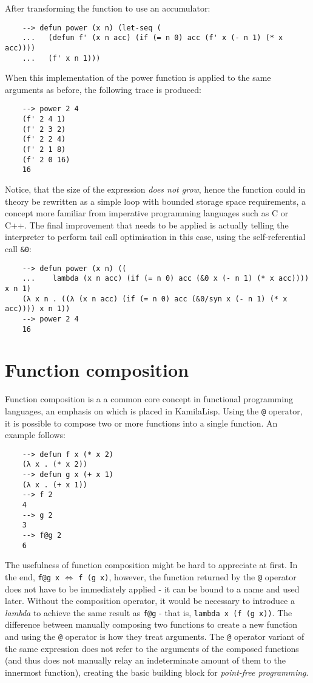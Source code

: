After transforming the function to use an accumulator:

\begin{Verbatim}
    --> defun power (x n) (let-seq (
    ...   (defun f' (x n acc) (if (= n 0) acc (f' x (- n 1) (* x acc))))
    ...   (f' x n 1)))
\end{Verbatim}

When this implementation of the power function is applied to the same arguments as before, the following trace is produced:

\begin{Verbatim}
    --> power 2 4
    (f' 2 4 1)
    (f' 2 3 2)
    (f' 2 2 4)
    (f' 2 1 8)
    (f' 2 0 16)
    16
\end{Verbatim}

Notice, that the size of the expression \textit{does not grow}, hence the function could in theory be rewritten as a simple loop with bounded storage space requirements, a concept more familiar from imperative programming languages such as C or C++. The final improvement that needs to be applied is actually telling the interpreter to perform tail call optimisation in this case, using the self-referential call \verb|&0|:

\begin{Verbatim}
    --> defun power (x n) ((
    ...    lambda (x n acc) (if (= n 0) acc (&0 x (- n 1) (* x acc)))) x n 1)
    (λ x n . ((λ (x n acc) (if (= n 0) acc (&0/syn x (- n 1) (* x acc)))) x n 1))
    --> power 2 4
    16
\end{Verbatim}

\section{Function composition}

Function composition is a a common core concept in functional programming languages, an emphasis on which is placed in KamilaLisp. Using the \verb|@| operator, it is possible to compose two or more functions into a single function. An example follows:

\begin{Verbatim}
    --> defun f x (* x 2)
    (λ x . (* x 2))
    --> defun g x (+ x 1)
    (λ x . (+ x 1))
    --> f 2
    4
    --> g 2
    3
    --> f@g 2
    6
\end{Verbatim}

The usefulness of function composition might be hard to appreciate at first. In the end, \verb|f@g x| $\Leftrightarrow$ \verb|f (g x)|, however, the function returned by the \verb|@| operator does not have to be immediately applied - it can be bound to a name and used later. Without the composition operator, it would be necessary to introduce a \textit{lambda} to achieve the same result as \verb|f@g| - that is, \verb|lambda x (f (g x))|. The difference between manually composing two functions to create a new function and using the \verb|@| operator is how they treat arguments. The \verb|@| operator variant of the same expression does not refer to the arguments of the composed functions (and thus does not manually relay an indeterminate amount of them to the innermost function), creating the basic building block for \textit{point-free programming}.

